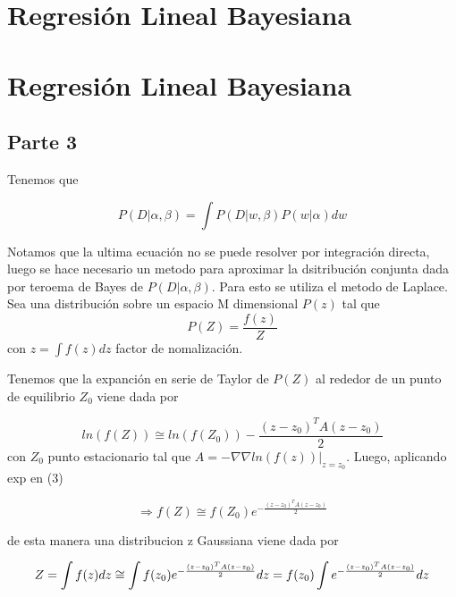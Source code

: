 \section{Regresión Lineal Bayesiana}

\section{Regresión Lineal Bayesiana}


\subsection{Parte 3}
Tenemos que

\begin{equation}
    P(D|\alpha,\beta)=\int  P(D|w,\beta)P(w|\alpha)dw
\end{equation}

Notamos que la ultima ecuación no se puede resolver por integración  directa, luego se hace necesario un metodo para aproximar la dsitribución conjunta dada por teroema de Bayes de $ P(D|\alpha,\beta)$. Para esto se utiliza el metodo de Laplace. Sea una distribución sobre un espacio M dimensional $P(z)$ tal que
\begin{equation}
    P(Z)=\frac{f(z)}{Z}
\end{equation}
con $z=\int f(z) dz$ factor de nomalización. 

Tenemos que la expanción en serie de Taylor de $P(Z)$ al rededor de un punto de equilibrio $Z_{0}$ viene dada por


\begin{equation}
   ln (f(Z))\cong ln( f(Z_{0}))-\frac{(z-z_{0})^{T}A(z-z_{0})}{2}
\end{equation}
con $Z_{0}$ punto estacionario tal que $A=-\nabla \nabla ln(f(z))|_{z=z_{0}} $. Luego, aplicando exp en (3)

\begin{equation}
    \Rightarrow{f(Z)\cong  f(Z_{0})e^{-\frac{(z-z_{0})^{T}A(z-z_{0})}{2}}}
\end{equation}

de esta manera una distribucion z Gaussiana viene dada por

\begin{equation}
    Z=\int f(z) dz\cong \int f(z_{0})e^{-\frac{(z-z_{0})^{T}A(z-z_{0})}{2}} dz \\
    =f(z_{0})\int e^{-\frac{(z-z_{0})^{T}A(z-z_{0})}{2}} dz 
    
\end{equation}

